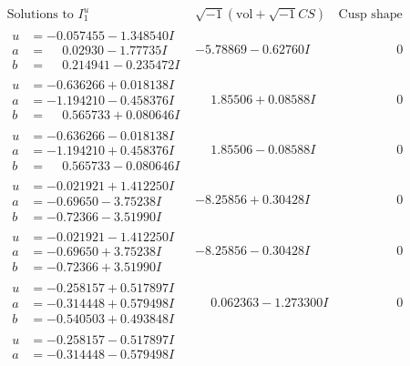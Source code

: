 \documentclass[1p]{elsarticle_modified}
\theoremstyle{definition}
\newcommand{\I}{\sqrt{-1}}
\begin{document}
$$\begin{array}{c|c|c}
\text{Solutions to }I^u_{1}& \I (\text{vol} + \sqrt{-1}CS) & \text{Cusp shape}\\
 \hline 
\begin{aligned}
u &= -0.057455 - 1.348540 I \\
a &= \phantom{-}0.02930 - 1.77735 I \\
b &= \phantom{-}0.214941 - 0.235472 I\end{aligned}
 & -5.78869 - 0.62760 I & \phantom{-0.000000 } 0 \\ \hline\begin{aligned}
u &= -0.636266 + 0.018138 I \\
a &= -1.194210 - 0.458376 I \\
b &= \phantom{-}0.565733 + 0.080646 I\end{aligned}
 & \phantom{-}1.85506 + 0.08588 I & \phantom{-0.000000 } 0 \\ \hline\begin{aligned}
u &= -0.636266 - 0.018138 I \\
a &= -1.194210 + 0.458376 I \\
b &= \phantom{-}0.565733 - 0.080646 I\end{aligned}
 & \phantom{-}1.85506 - 0.08588 I & \phantom{-0.000000 } 0 \\ \hline\begin{aligned}
u &= -0.021921 + 1.412250 I \\
a &= -0.69650 - 3.75238 I \\
b &= -0.72366 - 3.51990 I\end{aligned}
 & -8.25856 + 0.30428 I & \phantom{-0.000000 } 0 \\ \hline\begin{aligned}
u &= -0.021921 - 1.412250 I \\
a &= -0.69650 + 3.75238 I \\
b &= -0.72366 + 3.51990 I\end{aligned}
 & -8.25856 - 0.30428 I & \phantom{-0.000000 } 0 \\ \hline\begin{aligned}
u &= -0.258157 + 0.517897 I \\
a &= -0.314448 + 0.579498 I \\
b &= -0.540503 + 0.493848 I\end{aligned}
 & \phantom{-}0.062363 - 1.273300 I & \phantom{-0.000000 } 0 \\ \hline\begin{aligned}
u &= -0.258157 - 0.517897 I \\
a &= -0.314448 - 0.579498 I \\

\end{aligned}
\end{array}$$
\end{document}
